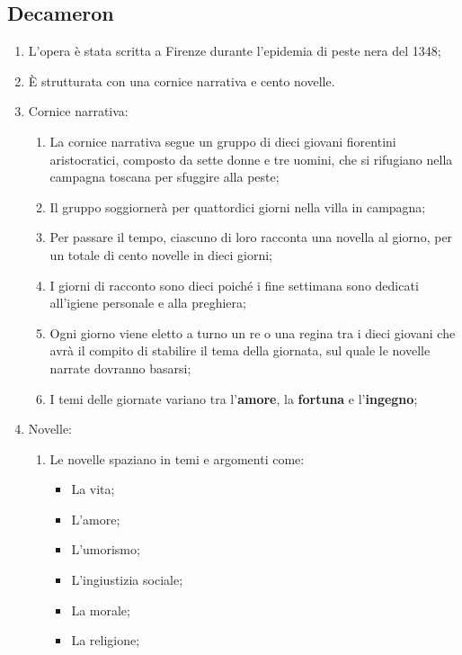 \documentclass{article}
\begin{document}
\subsection{Decameron}
\begin{enumerate}
    \item L'opera è stata scritta a Firenze durante l'epidemia di peste nera del 1348;
    \item È strutturata con una cornice narrativa e cento novelle.
    \item Cornice narrativa:
    \begin{enumerate}[label*=3.\arabic*.]
        \item La cornice narrativa segue un gruppo di dieci giovani fiorentini aristocratici,
            composto da sette donne e tre uomini, che si rifugiano nella campagna toscana per
            sfuggire alla peste;
        \item Il gruppo soggiornerà per quattordici giorni nella villa in campagna;
        \item Per passare il tempo, ciascuno di loro racconta una novella al giorno, per un
            totale di cento novelle in dieci giorni;
        \item I giorni di racconto sono dieci poiché i fine settimana sono dedicati all'igiene
            personale e alla preghiera;
        \item Ogni giorno viene eletto a turno un re o una regina tra i dieci giovani che
            avrà il compito di stabilire il tema della giornata, sul quale le novelle narrate
            dovranno basarsi;
        \item I temi delle giornate variano tra l'\textbf{amore}, la \textbf{fortuna} e 
            l'\textbf{ingegno}; 
    \end{enumerate}
    \item Novelle:
        \begin{enumerate}[label*=\arabic*.]
            \item Le novelle spaziano in temi e argomenti come:
            \begin{itemize}
                \item La vita;
                \item L'amore;
                \item L'umorismo;
                \item L'ingiustizia sociale;
                \item La morale;
                \item La religione;

\end{itemize}
\end{enumerate}
\end{enumerate}
\end{document}
